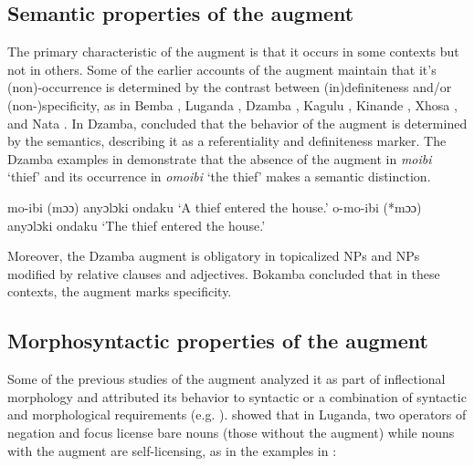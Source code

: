 \documentclass[output=paper]{langscibook}
\begin{document}
\subsection{Semantic properties of the augment}
The primary characteristic of the augment is that it occurs in some contexts but not in others. Some of the earlier accounts of the augment maintain that it's (non)-occurrence is determined by the contrast between (in)definiteness and/or (non-)specificity, as in Bemba \citep{givon1972studies},  Luganda \citep{ashton1987luganda,ferrari2009,mould1974syntax}, Dzamba \citep{bokamba1971specificity},  Kagulu \citep{petzell2003function}, Kinande \citep{progovac1993non}, Xhosa \citep{visser2008definiteness},  and Nata \citep{gambarage2013pre,gambarage2019belief}. In Dzamba, \citet[220]{bokamba1971specificity} concluded that the behavior of the augment is determined by the semantics, describing it as a referentiality and definiteness marker. The Dzamba examples in  demonstrate that the absence of the augment in \textit{moibi} ‘thief’  and its occurrence in \textit{omoibi} ‘the thief’  makes a semantic distinction.

\begin{exe}
\ex \label{hayagusii3}
\begin{xlist}
\ex\label{ex:choti:3a} mo-ibi (mɔɔ) anyɔlɔki  ondaku
\glt ‘A thief entered the house.’
\ex\label{ex:choti:3b}o-mo-ibi (*mɔɔ) anyɔlɔki    ondaku
\glt ‘The thief entered the house.’
\end{xlist}
\end{exe}
Moreover, the Dzamba augment is obligatory in topicalized NPs and NPs modified by relative clauses and adjectives. Bokamba concluded that in these contexts, the augment marks specificity.

\subsection{Morphosyntactic properties of the augment}
Some of the previous studies of the augment analyzed it as part of inflectional morphology and attributed its behavior to syntactic or a combination of syntactic and morphological requirements  (e.g. \citealt{dewees1971role,hyman1993augment,mould1974syntax}). \citet[224]{hyman1993augment} showed that in Luganda, two operators of negation and focus license bare nouns (those without the augment) while nouns with the augment are self-licensing, as in the examples in :
\end{document}
